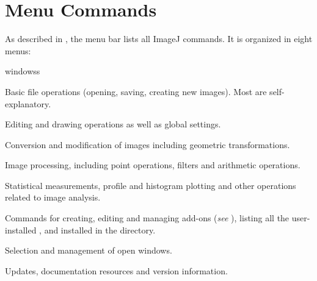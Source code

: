 
\part{Menu Commands\label{par:Commands}}

As described in , the menu bar lists
all ImageJ commands. It is organized in eight menus:
\begin{lyxlist}{windowss}
\item [{\userinterface{\noindent \nameref{sec:File}}}] \noindent Basic
file operations (opening, saving, creating new images). Most are self-explanatory.
\item [{\userinterface{\noindent \nameref{sec:Edit}}}] \noindent Editing
and drawing operations as well as global settings.
\item [{\userinterface{\noindent \nameref{sec:Image}}}] \noindent Conversion
and modification of images including geometric transformations.
\item [{\userinterface{\noindent \nameref{sec:Process}}}] \noindent Image
processing, including point operations, filters and arithmetic operations.
\item [{\userinterface{\noindent \nameref{sec:Analyze-Menu}}}] \noindent Statistical
measurements, profile and histogram plotting and other operations
related to image analysis.
\item [{\userinterface{\noindent \nameref{sec:Plugins}}}] \noindent Commands
for creating, editing and managing add-ons (\emph{see} ),
listing all the user-installed ,
 and  installed in the
 directory.
\item [{\userinterface{\noindent \nameref{sec:WindowMenu}}}] \noindent Selection
and management of open windows.
\item [{\userinterface{\noindent \nameref{sec:Help}}}] \noindent Updates,
documentation resources and version information.
\end{lyxlist}
